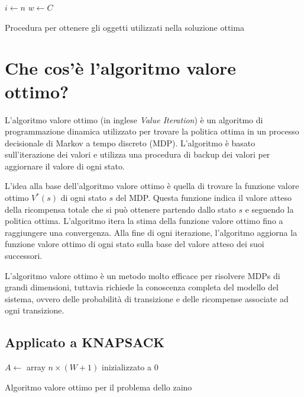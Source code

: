 \begin{algorithm}[H]
\SetAlgoLined
{}
$i \leftarrow n$\;
$w \leftarrow C$\;
\caption{Procedura per ottenere gli oggetti utilizzati nella soluzione ottima}
\end{algorithm}


\section{Che cos'è l'algoritmo valore ottimo?}

L'algoritmo valore ottimo (in inglese \textit{Value Iteration}) è un algoritmo di programmazione dinamica utilizzato per trovare la politica ottima in un processo decisionale di Markov a tempo discreto (MDP). L'algoritmo è basato sull'iterazione dei valori e utilizza una procedura di backup dei valori per aggiornare il valore di ogni stato.

L'idea alla base dell'algoritmo valore ottimo è quella di trovare la funzione valore ottimo $V^*(s)$ di ogni stato $s$ del MDP. Questa funzione indica il valore atteso della ricompensa totale che si può ottenere partendo dallo stato $s$ e seguendo la politica ottima. L'algoritmo itera la stima della funzione valore ottimo fino a raggiungere una convergenza. Alla fine di ogni iterazione, l'algoritmo aggiorna la funzione valore ottimo di ogni stato sulla base del valore atteso dei suoi successori.

L'algoritmo valore ottimo è un metodo molto efficace per risolvere MDPs di grandi dimensioni, tuttavia richiede la conoscenza completa del modello del sistema, ovvero delle probabilità di transizione e delle ricompense associate ad ogni transizione.


\subsection{Applicato a KNAPSACK}

\begin{algorithm}[H]
\SetAlgoLined
{}

$A \gets$ array $n \times (W+1)$ inizializzato a 0\;

\caption{Algoritmo valore ottimo per il problema dello zaino}
\label{alg:valore-ottimo-zaino}
\end{algorithm}

